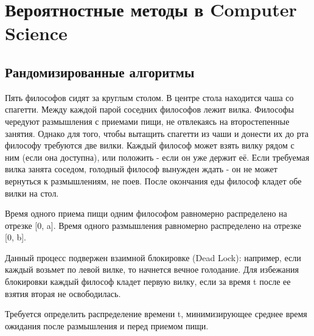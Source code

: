\section{Вероятностные методы в Computer Science}

\subsection{Рандомизированные алгоритмы}



\begin{problem}

Пять философов сидят за круглым столом. В центре стола находится чаша со
спагетти. Между каждой парой соседних философов лежит вилка. Философы чередуют размышления с приемами пищи, не отвлекаясь на второстепенные занятия. Однако
для того, чтобы вытащить спагетти из чаши и донести их до рта философу требуются
две вилки. Каждый философ может взять вилку рядом с ним (если она доступна), или положить - если он уже держит её. Если требуемая вилка занята соседом, голодный философ вынужден ждать - он не может вернуться к размышлениям, не поев. После окончания еды философ кладет обе вилки на стол.

Время одного приема пищи одним философом равномерно распределено на отрезке [0, a]. 
Время одного размышления равномерно распределено на отрезке [0, b].

Данный процесс подвержен взаимной блокировке (Dead Lock): например, если каждый возьмет по левой вилке, то начнется вечное голодание. Для избежания блокировки каждый философ кладет первую вилку, если за время t после ее взятия вторая не освободилась.

Требуется определить распределение времени t, минимизирующее среднее время ожидания после размышления и перед приемом пищи.

\end{problem}


